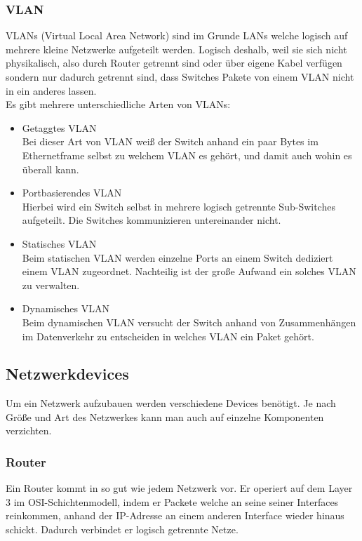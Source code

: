 \documentclass[11pt,a4paper]{report}
\begin{document}
\subsubsection{VLAN}\label{sssec:vlan}
VLANs (Virtual Local Area Network) sind im Grunde LANs welche logisch auf mehrere kleine Netzwerke aufgeteilt werden. Logisch deshalb, weil sie sich nicht physikalisch, also durch Router getrennt sind oder über eigene Kabel verfügen sondern nur dadurch getrennt sind, dass Switches Pakete von einem VLAN nicht in ein anderes lassen.\\
Es gibt mehrere unterschiedliche Arten von VLANs:\\
\begin{itemize}
\item Getaggtes VLAN\\
Bei dieser Art von VLAN weiß der Switch anhand ein paar Bytes im Ethernetframe selbst zu welchem VLAN es gehört, und damit auch wohin es überall kann.
\item Portbasierendes VLAN\\
Hierbei wird ein Switch selbst in mehrere logisch getrennte Sub-Switches aufgeteilt. Die Switches kommunizieren untereinander nicht.
\item Statisches VLAN\\
Beim statischen VLAN werden einzelne Ports an einem Switch dediziert einem VLAN zugeordnet. Nachteilig ist der große Aufwand ein solches VLAN zu verwalten.
\item Dynamisches VLAN\\
Beim dynamischen VLAN versucht der Switch anhand von Zusammenhängen im Datenverkehr zu entscheiden in welches VLAN ein Paket gehört. 
\end{itemize}
\subsection{Netzwerkdevices}
Um ein Netzwerk aufzubauen werden verschiedene Devices benötigt. Je nach Größe und Art des Netzwerkes kann man auch auf einzelne Komponenten verzichten. 
\subsubsection{Router}
Ein Router kommt in so gut wie jedem Netzwerk vor. Er operiert auf dem Layer 3 im OSI-Schichtenmodell, indem er Packete welche an seine seiner Interfaces reinkommen, anhand der IP-Adresse an einem anderen Interface wieder hinaus schickt. Dadurch verbindet er logisch getrennte Netze.\\
\end{document}
